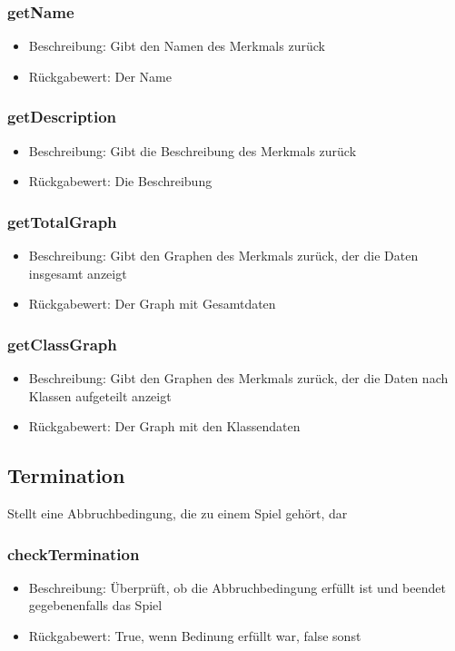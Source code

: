 \documentclass[a4paper]{scrreprt}
\begin{document}
	\subsubsection{getName}
	\begin{itemize}
		\item Beschreibung: Gibt den Namen des Merkmals zurück
		\item Rückgabewert: Der Name
	\end{itemize}
	\subsubsection{getDescription}
	\begin{itemize}
		\item Beschreibung: Gibt die Beschreibung des Merkmals zurück
		\item Rückgabewert: Die Beschreibung
	\end{itemize}
	\subsubsection{getTotalGraph}
	\begin{itemize}
		\item Beschreibung: Gibt den Graphen des Merkmals zurück, der die Daten insgesamt anzeigt
		\item Rückgabewert: Der Graph mit Gesamtdaten
	\end{itemize}
	\subsubsection{getClassGraph}
	\begin{itemize}
		\item Beschreibung: Gibt den Graphen des Merkmals zurück, der die Daten nach Klassen aufgeteilt anzeigt
		\item Rückgabewert: Der Graph mit den Klassendaten
	\end{itemize}

	\subsection{Termination}
	Stellt eine Abbruchbedingung, die zu einem Spiel gehört, dar
	\subsubsection{checkTermination}
	\begin{itemize}
		\item Beschreibung: Überprüft, ob die Abbruchbedingung erfüllt ist und beendet gegebenenfalls das Spiel
		\item Rückgabewert: True, wenn Bedinung erfüllt war, false sonst
	\end{itemize}
\end{document}
